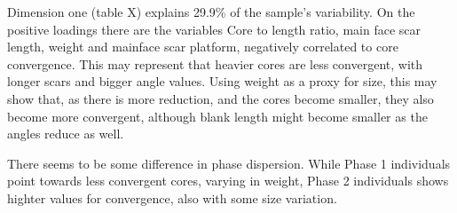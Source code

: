 \documentclass[12pt,twoside]{reedthesis}
\begin{document}
Dimension one (table X) explains 29.9\% of the sample's variability. On the positive loadings there are the variables Core to length ratio, main face scar length, weight and mainface scar platform, negatively correlated to core convergence. This may represent that heavier cores are less convergent, with longer scars and bigger angle values. Using weight as a proxy for size, this may show that, as there is more reduction, and the cores become smaller, they also become more convergent, although blank length might become smaller as the angles reduce as well.

There seems to be some difference in phase dispersion. While Phase 1 individuals point towards less convergent cores, varying in weight, Phase 2 individuals shows highter values for convergence, also with some size variation.
\end{document}
